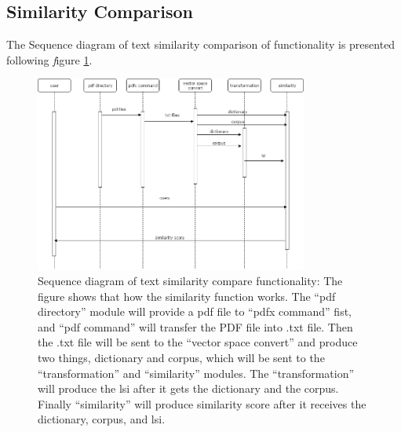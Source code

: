 \subsection{Similarity Comparison}

The Sequence diagram of text  similarity  comparison of functionality is presented  following \textit figure \ref{Sequence diagram}.

	\begin{figure}[htb]
		\begin{center}
			\includegraphics[width=0.8\textwidth]{Rainy_Sequence_diagram}
		\end{center}
		\caption{Sequence diagram of text similarity compare functionality: The figure shows that how the similarity function works. The ``pdf directory'' module will provide a pdf file to ``pdfx command'' fist, and ``pdf command'' will transfer the PDF file into .txt file. Then the .txt file will be sent to the ``vector space convert'' and produce two things, dictionary and corpus, which will be sent to the ``transformation'' and ``similarity'' modules. The ``transformation'' will produce the lsi after it gets the dictionary and the corpus. Finally ``similarity'' will produce similarity score after it receives the dictionary, corpus, and lsi. \label{Sequence diagram}}
	\end{figure}
\newpage